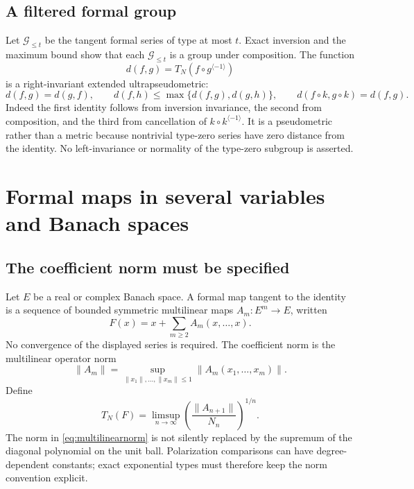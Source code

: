 \documentclass[11pt,a4paper]{article}
\numberwithin{equation}{section}
\theoremstyle{definition}
\theoremstyle{remark}
\newcommand{\Type}{T_N}
\newcommand{\inv}[1]{#1^{\langle-1\rangle}}
\begin{document}
\subsection{A filtered formal group}

Let $\mathcal G_{\le t}$ be the tangent formal series of type at most
$t$. Exact inversion and the maximum bound show that each
$\mathcal G_{\le t}$ is a group under composition. The function
\begin{equation}
 d(f,g)=\Type(f\circ\inv g)
 \label{eq:pseudodistance}
\end{equation}
is a right-invariant extended ultrapseudometric:
\[
 d(f,g)=d(g,f),\qquad
 d(f,h)\le\max\{d(f,g),d(g,h)\},\qquad
 d(f\circ k,g\circ k)=d(f,g).
\]
Indeed the first identity follows from inversion invariance, the second
from composition, and the third from cancellation of $k\circ\inv k$.
It is a pseudometric rather than a metric because nontrivial type-zero
series have zero distance from the identity. No left-invariance or
normality of the type-zero subgroup is asserted.

\section{Formal maps in several variables and Banach spaces}
\label{sec:banach}

\subsection{The coefficient norm must be specified}

Let $E$ be a real or complex Banach space. A formal map tangent to the
identity is a sequence of bounded symmetric multilinear maps
$A_m:E^m\to E$, written
\begin{equation}
 F(x)=x+\sum_{m\ge2}A_m(x,\ldots,x).
 \label{eq:banachmap}
\end{equation}
No convergence of the displayed series is required. The coefficient norm
is the multilinear operator norm
\begin{equation}
 \|A_m\|=\sup_{\|x_1\|,\ldots,\|x_m\|\le1}
                   \|A_m(x_1,\ldots,x_m)\|.
 \label{eq:multilinearnorm}
\end{equation}
Define
\begin{equation}
 \Type(F)=\limsup_{n\to\infty}
              \left(\frac{\|A_{n+1}\|}{N_n}\right)^{1/n}.
 \label{eq:banachtype}
\end{equation}
The norm in \eqref{eq:multilinearnorm} is not silently replaced by the
supremum of the diagonal polynomial on the unit ball. Polarization
comparisons can have degree-dependent constants; exact exponential types
must therefore keep the norm convention explicit.
\end{document}
